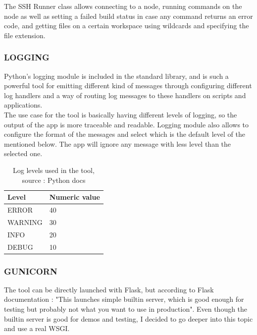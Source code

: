 \documentclass{article}
\begin{document}
The SSH Runner class allows connecting to a node, running commands on the node as well as setting a failed build status in case any command returns an error code, and getting files on a certain workspace using wildcards and specifying the file extension.

\subsubsection{LOGGING}

Python's logging module is included in the standard library, and is such a powerful tool for emitting different kind of messages through configuring different log handlers and a way of routing log messages to these handlers on scripts and applications.
~\\

The use case for the tool is basically having different levels of logging, so the output of the app is more traceable and readable. Logging module also allows to configure the format of the messages and select which is the default level of the mentioned below. The app will ignore any message with less level than the selected one.

\begin{table}[H]
\centering
\begin{tabular}{|l|l|}
\hline
\textbf{Level} & \textbf{Numeric value} \\ \hline
ERROR           & 40                \\ \hline
WARNING           & 30               \\ \hline
INFO          & 20               \\ \hline
DEBUG         & 10                     \\ \hline
\end{tabular}
\caption{Log levels used in the tool, source : Python docs}
\end{table}

\subsubsection{GUNICORN}

The tool can be directly launched with Flask, but according to Flask documentation : "This launches simple builtin server, which is good enough for testing but probably not what you want to use in production". Even though the builtin server is good for demos and testing, I decided to go deeper into this topic and use a real \gls{WSGI}. 
~\\
\end{document}
